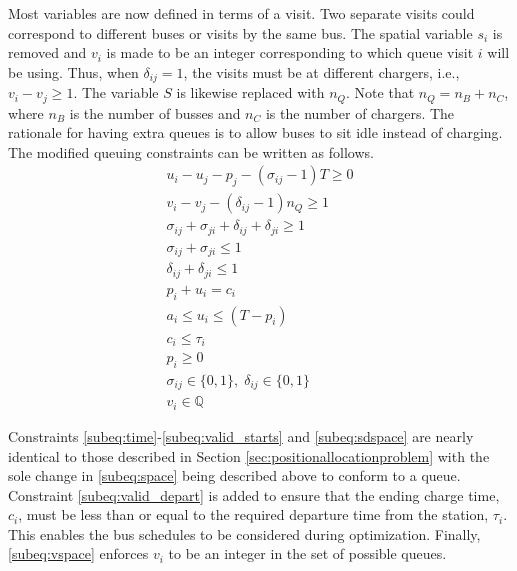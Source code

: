 \documentclass[letterpaper, 10pt, conference]{IEEEtran}
\begin{document}
Most variables are now defined in terms of a visit. Two separate visits could correspond to different buses or visits by the same bus. The spatial variable $s_i$ is removed and $v_i$ is made to be an integer corresponding to which queue visit $i$ will be using. Thus, when $\delta_{ij} = 1$, the visits must be at different chargers, i.e., $v_i-v_j \geq 1$. The variable $S$ is likewise replaced with $n_Q$. Note that $n_Q = n_B + n_C$, where $n_B$ is the number of busses and $n_C$ is the number of chargers. The rationale for having extra queues is to allow buses to sit idle instead of charging. The modified queuing constraints can be written as follows.
\begin{subequations}
\label{eq:packconstrs}
\begin{align}
    u_i - u_j - p_j - (\sigma_{ij} - 1)T \geq 0                      \label{subeq:time}         \\
    v_i - v_j - (\delta_{ij} - 1)n_Q \geq 1                            \label{subeq:space}        \\
    \sigma_{ij} + \sigma_{ji} + \delta_{ij} + \delta_{ji} \geq 1     \label{subeq:valid_pos}    \\
    \sigma_{ij} + \sigma_{ji} \leq 1                                 \label{subeq:sigma}        \\
    \delta_{ij} + \delta_{ji} \leq 1                                 \label{subeq:delta}        \\
    p_i + u_i = c_i                                                  \label{subeq:detach}       \\
    a_i \leq u_i \leq (T - p_i)                                      \label{subeq:valid_starts} \\
    c_i \leq \tau_i                                                  \label{subeq:valid_depart} \\
    p_i \geq 0                                                       \label{subeq:pos_charge} \\
    \sigma_{ij} \in \{0,1\},\;\delta_{ij} \in \{0,1\}                \label{subeq:sdspace}      \\
    v_i \in \mathbb{Q}                                           \label{subeq:vspace}
\end{align}
\end{subequations}

Constraints \eqref{subeq:time}-\eqref{subeq:valid_starts} and \eqref{subeq:sdspace} are nearly identical to those described in Section \ref{sec:positionallocationproblem} with the sole change in \eqref{subeq:space} being described above to conform to a queue.  Constraint \eqref{subeq:valid_depart} is added to ensure that the ending charge time, $c_i$, must be less than
or equal to the required departure time from the station, $\tau_i$. This enables the bus schedules to be considered during optimization. Finally, \eqref{subeq:vspace} enforces $v_i$ to be an integer in the set of possible queues.
\end{document}
